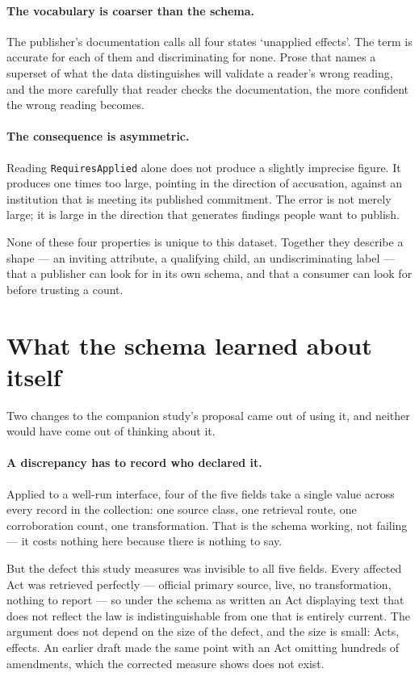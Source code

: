 \documentclass[11pt]{article}
\begin{document}
\paragraph{The vocabulary is coarser than the schema.} The publisher's
documentation calls all four states `unapplied effects'. The term is accurate
for each of them and discriminating for none. Prose that names a superset of
what the data distinguishes will validate a reader's wrong reading, and the
more carefully that reader checks the documentation, the more confident the
wrong reading becomes.

\paragraph{The consequence is asymmetric.} Reading \texttt{RequiresApplied}
alone does not produce a slightly imprecise figure. It produces one
\nOverstatementFactor{} times too large, pointing in the direction of
accusation, against an institution that is meeting its published commitment.
The error is not merely large; it is large in the direction that generates
findings people want to publish.

None of these four properties is unique to this dataset. Together they describe
a shape --- an inviting attribute, a qualifying child, an undiscriminating
label --- that a publisher can look for in its own schema, and that a consumer
can look for before trusting a count.

\section{What the schema learned about itself}\label{sec:schema}

Two changes to the companion study's proposal came out of using it, and neither
would have come out of thinking about it.

\paragraph{A discrepancy has to record who declared it.} Applied to a well-run
interface, four of the five fields take a single value across every record in
the collection: one source class, one retrieval route, one corroboration count,
one transformation. That is the schema working, not failing --- it costs
nothing here because there is nothing to say.

But the defect this study measures was invisible to all five fields. Every
affected Act was retrieved perfectly --- official primary source, live, no
transformation, nothing to report --- so under the schema as written an Act
displaying text that does not reflect the law is indistinguishable from one
that is entirely current. The argument does not depend on the size of the
defect, and the size is small: \nActsAffected{} Acts, \nEffects{} effects. An
earlier draft made the same point with an Act omitting hundreds of amendments,
which the corrected measure shows does not exist.
\end{document}
